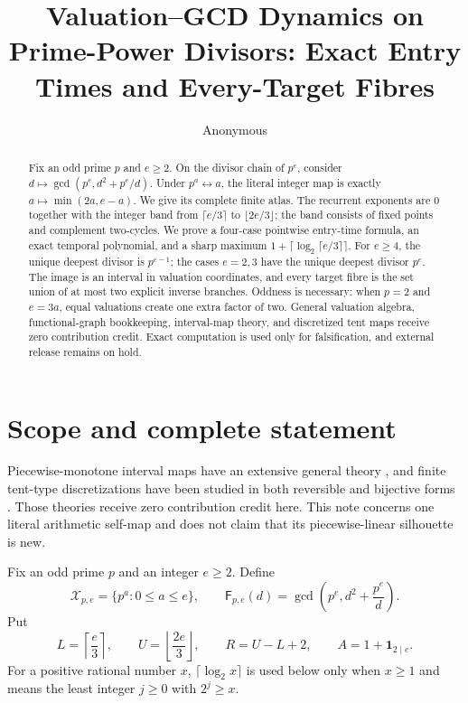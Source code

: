 \documentclass[10pt,a4paper]{amsart}
\title[Valuation--gcd dynamics]{Valuation--GCD Dynamics on Prime-Power
Divisors: Exact Entry Times and Every-Target Fibres}
\author{Anonymous}
\date{}
\theoremstyle{definition}
\theoremstyle{remark}
\newcommand{\X}{\mathcal X}
\newcommand{\F}{\mathsf F}
\begin{document}
\begin{abstract}
Fix an odd prime $p$ and $e\geq2$.  On the divisor chain of $p^e$, consider
$d\mapsto\gcd(p^e,d^2+p^e/d)$.  Under $p^a\leftrightarrow a$, the literal
integer map is exactly $a\mapsto\min(2a,e-a)$.  We give its complete finite
atlas.  The recurrent exponents are $0$ together with the integer band from
$\lceil e/3\rceil$ to $\lfloor2e/3\rfloor$; the band consists of fixed points
and complement two-cycles.  We prove a four-case pointwise entry-time formula,
an exact temporal polynomial, and a sharp maximum
$1+\lceil\log_2\lceil e/3\rceil\rceil$.  For $e\geq4$, the unique deepest
divisor is $p^{e-1}$; the cases $e=2,3$ have the unique deepest divisor $p^e$.
The image is an interval in valuation coordinates, and every target fibre is
the set union of at most two explicit inverse branches.  Oddness is necessary:
when $p=2$ and $e=3a$, equal valuations create one extra factor of two.  General
valuation algebra, functional-graph bookkeeping, interval-map theory, and
discretized tent maps receive zero contribution credit.  Exact computation is
used only for falsification, and external release remains on hold.
\end{abstract}

\maketitle

\section{Scope and complete statement}

Piecewise-monotone interval maps have an extensive general theory
\citep{MilnorThurston1988}, and finite tent-type discretizations have been
studied in both reversible and bijective forms
\citep{Kuzovlev2004,ChoiEtAl2026}.  Those theories receive zero contribution
credit here.  This note concerns one literal arithmetic self-map and does not
claim that its piecewise-linear silhouette is new.

Fix an odd prime $p$ and an integer $e\geq2$.  Define
\begin{equation}\label{eq:literal-map}
 \X_{p,e}=\{p^a:0\leq a\leq e\},\qquad
 \F_{p,e}(d)=\gcd\!\left(p^e,d^2+\frac{p^e}{d}\right).
\end{equation}
Put
\begin{equation}\label{eq:parameters}
 L=\left\lceil\frac e3\right\rceil,
 \qquad U=\left\lfloor\frac{2e}{3}\right\rfloor,
 \qquad R=U-L+2,
 \qquad A=1+\boldsymbol 1_{2\mid e}.
\end{equation}
For a positive rational number $x$, $\lceil\log_2x\rceil$ is used below only
when $x\geq1$ and means the least integer $j\geq0$ with $2^j\geq x$.
\end{document}
